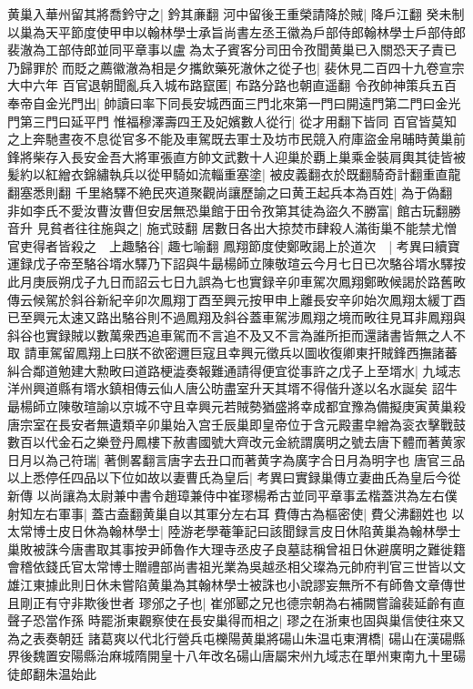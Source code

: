 黄巢入華州留其將喬鈐守之|{
	鈐其亷翻}
河中留後王重榮請降於賊|{
	降戶江翻}
癸未制以巢為天平節度使甲申以翰林學士承旨尚書左丞王徽為戶部侍郎翰林學士戶部侍郎裴澈為工部侍郎並同平章事以盧為太子賓客分司田令孜聞黄巢已入關恐天子責已乃歸罪於而貶之薦徽澈為相是夕攜飲藥死澈休之從子也|{
	裴休見二百四十九卷宣宗大中六年}
百官退朝聞亂兵入城布路竄匿|{
	布路分路也朝直遥翻}
令孜帥神策兵五百奉帝自金光門出|{
	帥讀曰率下同長安城西面三門北來第一門曰開遠門第二門曰金光門第三門曰延平門}
惟福穆澤壽四王及妃嬪數人從行|{
	從才用翻下皆同}
百官皆莫知之上奔馳晝夜不息從官多不能及車駕既去軍士及坊市民競入府庫盜金帛晡時黄巢前鋒將柴存入長安金吾大將軍張直方帥文武數十人迎巢於覇上巢乘金裝肩輿其徒皆被髪約以紅繒衣錦繡執兵以從甲騎如流輜重塞塗|{
	被皮義翻衣於既翻騎奇計翻重直龍翻塞悉則翻}
千里絡驛不絶民夾道聚觀尚讓歷諭之曰黄王起兵本為百姓|{
	為于偽翻}
非如李氏不愛汝曹汝曹但安居無恐巢館于田令孜第其徒為盜久不勝富|{
	館古玩翻勝音升}
見貧者往往施與之|{
	施式豉翻}
居數日各出大掠焚市肆殺人滿街巢不能禁尤憎官吏得者皆殺之　上趣駱谷|{
	趣七喻翻}
鳳翔節度使鄭畋謁上於道次　|{
	考異曰續寶運録戊子帝至駱谷壻水驛乃下詔與牛朂楊師立陳敬瑄云今月七日已次駱谷壻水驛按此月庚辰朔戊子九日而詔云七日九誤為七也實録辛卯車駕次鳳翔鄭畋候謁於路舊畋傳云候駕於斜谷新紀辛卯次鳳翔丁酉至興元按甲申上離長安辛卯始次鳳翔太緩丁酉已至興元太速又路出駱谷則不過鳳翔及斜谷蓋車駕涉鳳翔之境而畋往見耳非鳳翔與斜谷也實録賊以數萬衆西追車駕而不言追不及又不言為誰所拒而還諸書皆無之人不取}
請車駕留鳳翔上曰朕不欲密邇巨寇且幸興元徵兵以圖收復卿東扞賊鋒西撫諸蕃糾合鄰道勉建大勲畋曰道路梗澁奏報難通請得便宜從事許之戊子上至壻水|{
	九域志洋州興道縣有壻水鎮相傳云仙人唐公昉盡室升天其壻不得偕升遂以名水誕矣}
詔牛朂楊師立陳敬瑄諭以京城不守且幸興元若賊勢猶盛將幸成都宜豫為備擬庚寅黄巢殺唐宗室在長安者無遺類辛卯巢始入宫壬辰巢即皇帝位于含元殿畫皁繒為衮衣擊戰鼓數百以代金石之樂登丹鳳樓下赦書國號大齊改元金統謂廣明之號去唐下體而著黄家日月以為己符瑞|{
	著側畧翻言唐字去丑口而著黄字為廣字合日月為明字也}
唐官三品以上悉停任四品以下位如故以妻曹氏為皇后|{
	考異曰實録巢傳立妻曲氏為皇后今從新傳}
以尚讓為太尉兼中書令趙璋兼侍中崔璆楊希古並同平章事孟楷蓋洪為左右僕射知左右軍事|{
	蓋古盍翻黄巢自以其軍分左右耳}
費傳古為樞密使|{
	費父沸翻姓也}
以太常博士皮日休為翰林學士|{
	陸游老學菴筆記曰該聞録言皮日休陷黄巢為翰林學士巢敗被誅今唐書取其事按尹師魯作大理寺丞皮子良墓誌稱曾祖日休避廣明之難徙籍會稽依錢氏官太常博士贈禮部尚書祖光業為吳越丞相父璨為元帥府判官三世皆以文雄江東據此則日休未嘗陷黄巢為其翰林學士被誅也小說謬妄無所不有師魯文章傳世且剛正有守非欺後世者}
璆邠之子也|{
	崔邠郾之兄也德宗朝為右補闕嘗論裴延齡有直聲子恐當作孫}
時罷浙東觀察使在長安巢得而相之|{
	璆之在浙東也固與巢信使往來又為之表奏朝廷}
諸葛爽以代北行營兵屯櫟陽黄巢將碭山朱温屯東渭橋|{
	碭山在漢碭縣界後魏置安陽縣治麻城隋開皇十八年改名碭山唐屬宋州九域志在單州東南九十里碭徒郎翻朱温始此}
